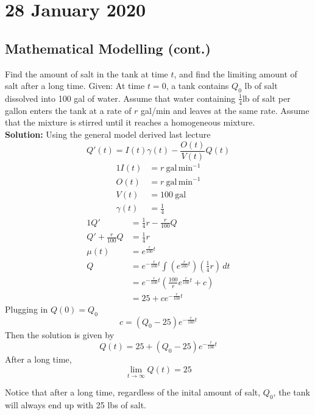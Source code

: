 \documentclass[diffeq.tex]{subfiles}
\begin{document}
\chapter{28 January 2020}
    \section{Mathematical Modelling (cont.)}
    \begin{example}[Modelling, 2.3.1]
        \label{ex5-1}
        Find the amount of salt in the tank at time $t$, and find the limiting amount of salt after a long time.
        Given: At time $t = 0$, a tank contains $Q_{0}$ lb of salt dissolved into 100 gal of water. Assume that water containing $\frac{1}{4}$lb of salt per gallon enters the tank at a rate of $r$ gal/min and leaves at the same rate. Assume that the mixture is stirred until it reaches a homogeneous mixture.\\[1em]
        \textbf{Solution:}
        Using the general model derived last lecture
        \begin{equation}
            Q'(t) = I(t)\gamma(t) - \frac{O(t)}{V(t)}Q(t)
        \end{equation}
        \begin{alignat}{1}
            I(t) &= r\ \text{gal}\,\text{min}^{-1}\\
            O(t) &= r\ \text{gal}\,\text{min}^{-1}\\
            V(t) &= 100\ \text{gal}\\
            \gamma(t) &= \frac{1}{4}
        \end{alignat}
        \begin{alignat}{1}
            Q' &= \frac{1}{4}r - \frac{r}{100}Q\\
            Q' + \frac{r}{100}Q &= \frac{1}{4}r\\
            \mu(t) &= e^{\frac{r}{100}t}\\
            Q &= e^{-\frac{r}{100}t}\int \left(e^{\frac{r}{100}t}\right)\left(\frac{1}{4}r\right)\,dt\\
            &= e^{-\frac{r}{100}t}\left(\frac{100}{r}e^{\frac{r}{100}t} + c\right)\\
            &= 25 + ce^{-\frac{r}{100}t}
        \end{alignat}
        Plugging in $Q(0) = Q_{0}$
        \begin{equation}
            c = (Q_{0} - 25)e^{-\frac{r}{100}t}
        \end{equation}
        Then the solution is given by
        \begin{equation}
            Q(t) = 25 + (Q_{0} - 25)e^{-\frac{r}{100}t}
        \end{equation}
        After a long time,
        \begin{equation}
            \lim_{t\to\infty} Q(t) = 25
        \end{equation}
    \end{example}
    \begin{remark}
        Notice that after a long time, regardless of the inital amount of salt, $Q_{0}$, the tank will always end up with 25 lbs of salt.
    \end{remark}
    \np
\end{document}
